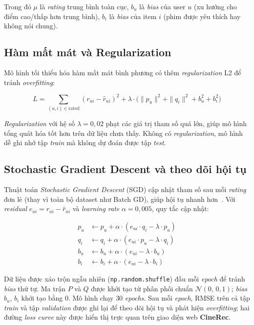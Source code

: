 \documentclass[../BTL.tex]{subfiles}
\begin{document}
Trong đó $\mu$ là \textit{rating} trung bình toàn cục, $b_u$ là \textit{bias} của
user $u$ (xu hướng cho điểm cao/thấp hơn trung bình), $b_i$ là \textit{bias} của
item $i$ (phim được yêu thích hay không nói chung).

\subsection{Hàm mất mát và Regularization}
\label{section:2.3.2}

Mô hình tối thiểu hóa hàm mất mát bình phương có thêm \textit{regularization} L2
để tránh \textit{overfitting}:

\begin{equation}
    L = \sum_{(u,i) \in \text{rated}} (r_{ui} - \hat{r}_{ui})^2
      + \lambda \cdot \bigl(\|p_u\|^2 + \|q_i\|^2 + b_u^2 + b_i^2\bigr)
    \label{eq:loss}
\end{equation}

\textit{Regularization} với hệ số $\lambda = 0{,}02$ phạt các giá trị tham số quá
lớn, giúp mô hình tổng quát hóa tốt hơn trên dữ liệu chưa thấy. Không có
\textit{regularization}, mô hình dễ ghi nhớ tập \textit{train} mà không dự đoán
được tập \textit{test}.

\subsection{Stochastic Gradient Descent và theo dõi hội tụ}
\label{section:2.3.3}

Thuật toán \textit{Stochastic Gradient Descent} (SGD) cập nhật tham số sau mỗi
\textit{rating} đơn lẻ (thay vì toàn bộ dataset như Batch GD), giúp hội tụ nhanh
hơn~\cite{koren2009matrix}. Với \textit{residual}
$e_{ui} = r_{ui} - \hat{r}_{ui}$ và \textit{learning rate} $\alpha = 0{,}005$,
quy tắc cập nhật:

\begin{align}
    p_u &\leftarrow p_u + \alpha \cdot (e_{ui} \cdot q_i - \lambda \cdot p_u)
        \label{eq:sgd_p} \\
    q_i &\leftarrow q_i + \alpha \cdot (e_{ui} \cdot p_u - \lambda \cdot q_i)
        \label{eq:sgd_q} \\
    b_u &\leftarrow b_u + \alpha \cdot (e_{ui} - \lambda \cdot b_u)
        \label{eq:sgd_bu} \\
    b_i &\leftarrow b_i + \alpha \cdot (e_{ui} - \lambda \cdot b_i)
        \label{eq:sgd_bi}
\end{align}

Dữ liệu được xáo trộn ngẫu nhiên (\texttt{np.random.shuffle}) đầu mỗi \textit{epoch}
để tránh \textit{bias} thứ tự. Ma trận $P$ và $Q$ được khởi tạo từ phân phối chuẩn
$\mathcal{N}(0,\, 0{,}1)$; \textit{bias} $b_u$, $b_i$ khởi tạo bằng $0$. Mô hình
chạy $30$ \textit{epochs}. Sau mỗi \textit{epoch}, RMSE trên cả tập \textit{train}
và tập \textit{validation} được ghi lại để theo dõi hội tụ và phát hiện
\textit{overfitting}; hai đường \textit{loss curve} này được hiển thị trực quan
trên giao diện web \textbf{CineRec}.
\end{document}
